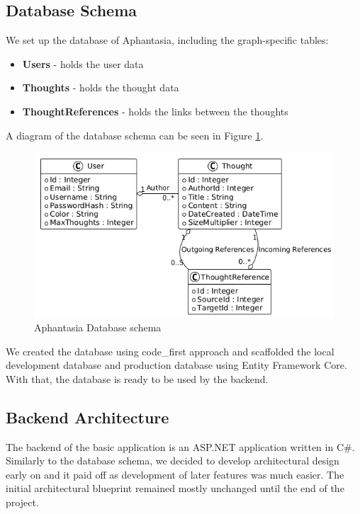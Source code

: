 \subsection{Database Schema}
We set up the database of Aphantasia, including the graph-specific tables:
\begin{itemize}
    \item \textbf{Users} - holds the user data
    \item \textbf{Thoughts} - holds the thought data
    \item \textbf{ThoughtReferences} - holds the links between the thoughts
\end{itemize}

A diagram of the database schema can be seen in Figure \ref{obr:afantazie_database_schema}.
\begin{figure}[h]\centering
    \includegraphics[width=140mm]{img/afantazie_database_schema.png}
    \caption{Aphantasia Database schema}
    \label{obr:afantazie_database_schema}
\end{figure}

We created the database using \gls{code_first} approach and scaffolded the local development database and production database using Entity Framework Core.
With that, the database is ready to be used by the backend.

\subsection{Backend Architecture}
\label{sec:implementation_backend}
The backend of the basic application is an ASP.NET application written in C\#.
Similarly to the database schema, we decided to develop architectural design early on and it paid off as development of later features was much easier. 
The initial architectural blueprint remained mostly unchanged until the end of the project.

